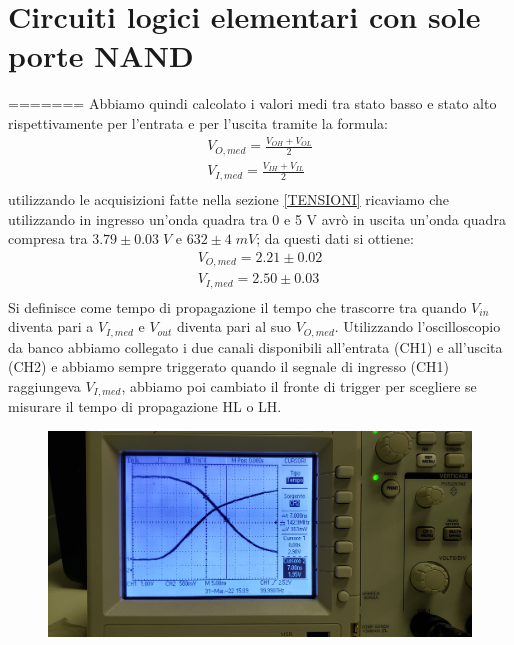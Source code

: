 \documentclass[10pt, a4paper, italian]{article}
\begin{document}
\section{Circuiti logici elementari con sole porte NAND}
=======
Abbiamo quindi calcolato i valori medi tra stato basso e stato alto rispettivamente per l'entrata e per l'uscita tramite la formula:
\begin{gather*}
V_{O,med}=\frac{V_{OH}+V_{OL}}{2}\\
V_{I,med}=\frac{V_{IH}+V_{IL}}{2}\\
\end{gather*}
utilizzando le acquisizioni fatte nella sezione \ref{TENSIONI} ricaviamo che utilizzando in ingresso un'onda quadra tra 0 e 5 V avrò in uscita un'onda quadra compresa tra $3.79 \pm 0.03 \; V$ e $ 632 \pm 4 \; mV$; da questi dati si ottiene:
\begin{gather*}
V_{O,med}=2.21 \pm 0.02\\
V_{I,med}=2.50 \pm 0.03\\
\end{gather*}
Si definisce come tempo di propagazione il tempo che trascorre tra quando $V_{in}$ diventa pari a $V_{I,med}$ e $V_{out}$ diventa pari al suo $V_{O,med}$.
Utilizzando l'oscilloscopio da banco abbiamo collegato i due canali disponibili all'entrata (CH1) e all'uscita (CH2) e abbiamo sempre triggerato quando il segnale di ingresso (CH1) raggiungeva $V_{I,med}$, abbiamo poi cambiato il fronte di trigger per scegliere se misurare il tempo di propagazione HL o LH.
\begin{figure}
	\includegraphics[width=\textwidth]{LH1}
\end{figure}
\end{document}
